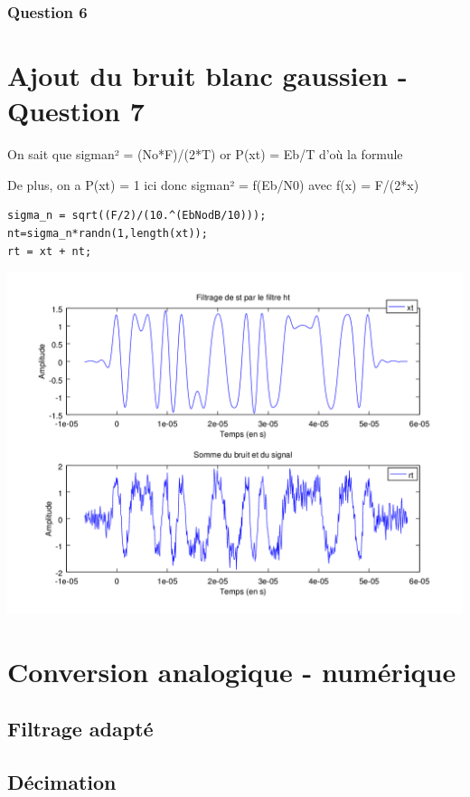 \documentclass{acm_proc_article-sp}
\begin{document}
\subsubsection{Question 6}


\section{Ajout du bruit blanc gaussien - Question 7}

On sait que sigman² = (No*F)/(2*T)
or P(xt) = Eb/T d'où la formule

De plus, on a P(xt) = 1 ici donc sigman² = f(Eb/N0) avec f(x) = F/(2*x)

\begin{lstlisting}
sigma_n = sqrt((F/2)/(10.^(EbNodB/10)));
nt=sigma_n*randn(1,length(xt));
rt = xt + nt;
\end{lstlisting}

\begin{center}
\includegraphics[scale=0.45]{signalBruite_7.png}
\end{center}


\section{Conversion analogique - numérique}
\subsection{Filtrage adapté}
\subsection{Décimation}
\end{document}
